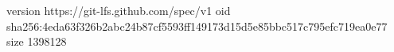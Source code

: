 version https://git-lfs.github.com/spec/v1
oid sha256:4eda63f326b2abc24b87cf5593ff149173d15d5e85bbc517c795efc719ea0e77
size 1398128
